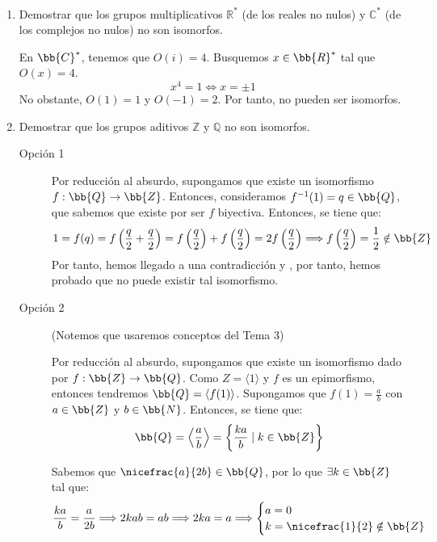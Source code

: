 \begin{ejercicio}\label{ej:2.36}~
    \begin{enumerate}
        \item Demostrar que los grupos multiplicativos $\mathbb{R}^{\ast}$ (de los reales no nulos) y $\mathbb{C}^{\ast}$ (de los complejos no nulos) no son isomorfos.
        
        En $\bb{C}^*$, tenemos que $O(i)=4$. Busquemos $x\in \bb{R}^*$ tal que $O(x)=4$.
        \begin{equation*}
            x^4=1\iff x=\pm 1
        \end{equation*}
        No obstante, $O(1)=1$ y $O(-1)=2$. Por tanto, no pueden ser isomorfos.
        \item Demostrar que los grupos aditivos $\mathbb{Z}$ y $\mathbb{Q}$ no son isomorfos.
        
        \begin{description}
            \item[Opción 1] 
            
            Por reducción al absurdo, supongamos que existe un isomorfismo $f:\bb{Q}\to \bb{Z}$. Entonces, consideramos $f^{-1}(1)=q\in \bb{Q}$, que sabemos que existe por ser $f$ biyectiva. Entonces, se tiene que:
            \begin{equation*}
                1=f(q)=f\left(\frac{q}{2}+\frac{q}{2}\right)=f\left(\frac{q}{2}\right)+f\left(\frac{q}{2}\right)=2f\left(\frac{q}{2}\right)
                \Longrightarrow f\left(\frac{q}{2}\right)=\frac{1}{2}\notin \bb{Z}
            \end{equation*}
            Por tanto, hemos llegado a una contradicción y , por tanto, hemos probado que no puede existir tal isomorfismo.


            \item[Opción 2] (Notemos que usaremos conceptos del Tema 3)
            
            Por reducción al absurdo, supongamos que existe un isomorfismo dado por $f:\bb{Z}\to \bb{Q}$. Como $Z=\langle 1\rangle$ y $f$ es un epimorfismo, entonces tendremos $\bb{Q}=\langle f(1)\rangle$. Supongamos que $f(1)=\frac{a}{b}$ con $a\in \bb{Z}$ y $b\in \bb{N}$. Entonces, se tiene que:
            \begin{equation*}
                \bb{Q}=\left\langle \frac{a}{b}\right\rangle=\left\{\frac{ka}{b}\mid k\in \bb{Z}\right\}
            \end{equation*}

            Sabemos que $\nicefrac{a}{2b}\in \bb{Q}$, por lo que $\exists k\in \bb{Z}$ tal que:
            \begin{equation*}
                \frac{ka}{b}=\frac{a}{2b}\Longrightarrow 2kab=ab\Longrightarrow 2ka=a\Longrightarrow\begin{cases}
                    a=0\\
                    k=\nicefrac{1}{2}\notin \bb{Z}
                \end{cases}
            \end{equation*}


\end{description}
\end{enumerate}
\end{ejercicio}
